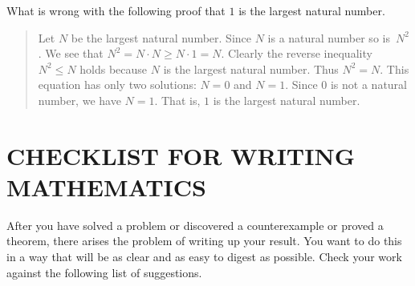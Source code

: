 \begin{prob} What is wrong with the following proof that $1$ is the largest natural number.
 \begin{quote}
Let $N$ be the largest natural number.  Since $N$ is a natural number so is~$N^2$.  We see
that $N^2 = N \cdot N \ge N \cdot 1 = N$.  Clearly the reverse inequality $N^2 \le N$ holds
because $N$ is the largest natural number.  Thus $N^2 = N$.  This equation has only two
solutions: $N=0$ and $N=1$.  Since $0$ is not a natural number, we have $N=1$.  That is, $1$
is the largest natural number.
 \end{quote}
\end{prob}







\section{CHECKLIST FOR WRITING MATHEMATICS}  After you have solved a problem or discovered a
counterexample or proved a theorem, there arises the problem of writing up your result.  You
want to do this in a way that will be as clear and as easy to digest as possible. Check your
work against the following list of suggestions.

